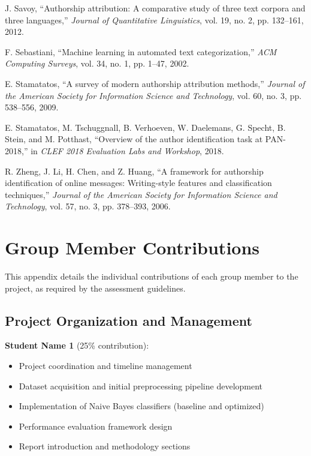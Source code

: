 \documentclass[11pt,a4paper]{article}
\begin{document}
\begin{thebibliography}{99}
J. Savoy, ``Authorship attribution: A comparative study of three text corpora and three languages,'' \textit{Journal of Quantitative Linguistics}, vol. 19, no. 2, pp. 132--161, 2012.

F. Sebastiani, ``Machine learning in automated text categorization,'' \textit{ACM Computing Surveys}, vol. 34, no. 1, pp. 1--47, 2002.

E. Stamatatos, ``A survey of modern authorship attribution methods,'' \textit{Journal of the American Society for Information Science and Technology}, vol. 60, no. 3, pp. 538--556, 2009.

E. Stamatatos, M. Tschuggnall, B. Verhoeven, W. Daelemans, G. Specht, B. Stein, and M. Potthast, ``Overview of the author identification task at PAN-2018,'' in \textit{CLEF 2018 Evaluation Labs and Workshop}, 2018.

R. Zheng, J. Li, H. Chen, and Z. Huang, ``A framework for authorship identification of online messages: Writing-style features and classification techniques,'' \textit{Journal of the American Society for Information Science and Technology}, vol. 57, no. 3, pp. 378--393, 2006.

\end{thebibliography}

\newpage
\appendix

\section{Group Member Contributions}

This appendix details the individual contributions of each group member to the project, as required by the assessment guidelines.

\subsection{Project Organization and Management}

\textbf{Student Name 1} (25\% contribution):
\begin{itemize}
    \item Project coordination and timeline management
    \item Dataset acquisition and initial preprocessing pipeline development
    \item Implementation of Naive Bayes classifiers (baseline and optimized)
    \item Performance evaluation framework design
    \item Report introduction and methodology sections
\end{itemize}
\end{document}
